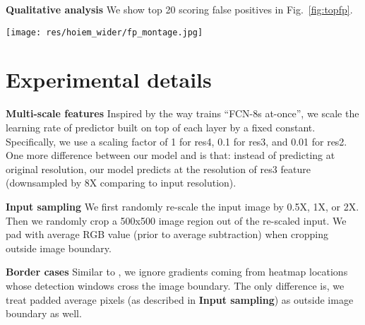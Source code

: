 \documentclass[10pt,twocolumn,letterpaper]{article}
\begin{document}
{\bf Qualitative analysis}
We show top 20 scoring false positives in Fig.~\ref{fig:topfp}. 

\begin{figure*}
  \centering
  \texttt{[image: res/hoiem\_wider/fp\_montage.jpg]}
  \caption{Top 20 scoring false positives on validation set. Error type is labeled at the left bottom of each image. ``face(bg)'' represents background confusion and ``face(loc)'' represents inaccurate localization. ``ov'' represents overlap with ground truth bounding boxes, ``1-r'' represents the percentage of detections whose confidence is below the current one's. Our detector seems to find faces that were not annotated (when prediction is on the face while ``ov'' equals to zero). }
  \label{fig:topfp}
\end{figure*}


\section{Experimental details}
\label{sec:experimental-details}
{\bf Multi-scale features} Inspired by the way \cite{shelhamer2016fully} trains ``FCN-8s at-once'', we scale the learning rate of predictor built on top of each layer by a fixed constant. Specifically, we use a scaling factor of 1 for res4, 0.1 for res3, and 0.01 for res2. One more difference between our model and \cite{shelhamer2016fully} is that: instead of predicting at original resolution, our model predicts at the resolution of res3 feature (downsampled by 8X comparing to input resolution). 

{\bf Input sampling} We first randomly re-scale the input image by 0.5X, 1X, or 2X. Then we randomly crop a 500x500 image region out of the re-scaled input. We pad with average RGB value (prior to average subtraction) when cropping outside image boundary. 

{\bf Border cases} Similar to \cite{ren2015faster}, we ignore gradients coming from heatmap locations whose detection windows cross the image boundary. The only difference is, we treat padded average pixels (as described in {\bf Input sampling}) as outside image boundary as well.
\end{document}
